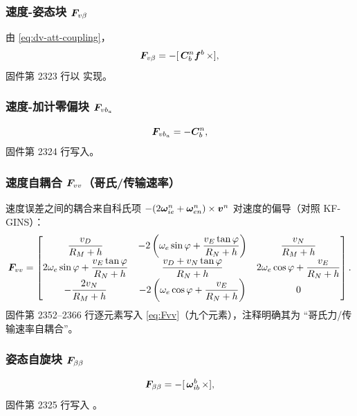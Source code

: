\subsubsection{速度-姿态块 $\boldsymbol{F}_{v\beta}$}

由 \cref{eq:dv-att-coupling}，
\begin{equation}
  \boldsymbol{F}_{v\beta} = -[\,\boldsymbol{C}_b^n\boldsymbol{f}^b\,\times],
  \label{eq:Fvbeta}
\end{equation}
固件第 2323 行以  实现。

\subsubsection{速度-加计零偏块 $\boldsymbol{F}_{v b_a}$}

\begin{equation}
  \boldsymbol{F}_{v b_a} = -\boldsymbol{C}_b^n,
  \label{eq:Fvba}
\end{equation}
固件第 2324 行写入。

\subsubsection{速度自耦合 $\boldsymbol{F}_{vv}$（哥氏/传输速率）}

速度误差之间的耦合来自科氏项 $-(2\boldsymbol{\omega}_{ie}^n +
\boldsymbol{\omega}_{en}^n)\times\boldsymbol{v}^n$ 对速度的偏导（对照 KF-GINS）：
\begin{equation}
  \boldsymbol{F}_{vv} =
  \begin{bmatrix}
    \dfrac{v_D}{R_M+h} &
    -2\left(\omega_e\sin\varphi + \dfrac{v_E\tan\varphi}{R_N+h}\right) &
    \dfrac{v_N}{R_M+h} \\[1.2ex]
    2\omega_e\sin\varphi + \dfrac{v_E\tan\varphi}{R_N+h} &
    \dfrac{v_D + v_N\tan\varphi}{R_N+h} &
    2\omega_e\cos\varphi + \dfrac{v_E}{R_N+h} \\[1.2ex]
    -\dfrac{2v_N}{R_M+h} &
    -2\left(\omega_e\cos\varphi + \dfrac{v_E}{R_N+h}\right) & 0
  \end{bmatrix}.
  \label{eq:Fvv}
\end{equation}
固件第 2352--2366 行逐元素写入 \cref{eq:Fvv}（九个元素），注释明确其为
``哥氏力/传输速率自耦合''。

\subsubsection{姿态自旋块 $\boldsymbol{F}_{\beta\beta}$}

\begin{equation}
  \boldsymbol{F}_{\beta\beta} = -[\,\boldsymbol{\omega}_{ib}^b\,\times],
  \label{eq:Fbb}
\end{equation}
固件第 2325 行写入 。

